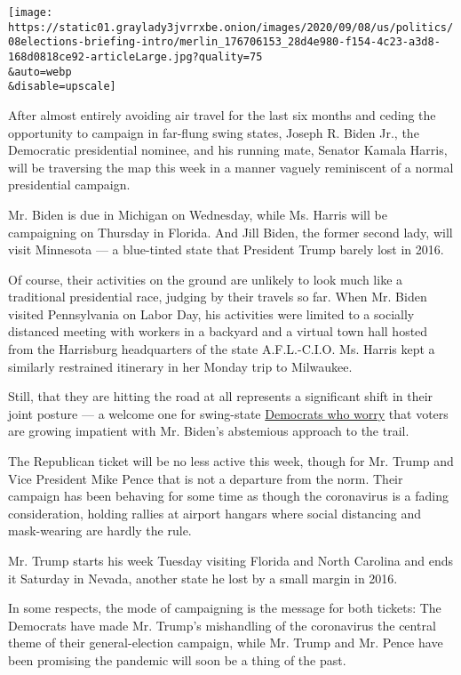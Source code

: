\texttt{[image: https://static01.graylady3jvrrxbe.onion/images/2020/09/08/us/politics/08elections-briefing-intro/merlin\_176706153\_28d4e980-f154-4c23-a3d8-168d0818ce92-articleLarge.jpg?quality=75\\\&auto=webp\\\&disable=upscale]}

After almost entirely avoiding air travel for the last six months and
ceding the opportunity to campaign in far-flung swing states, Joseph R.
Biden Jr., the Democratic presidential nominee, and his running mate,
Senator Kamala Harris, will be traversing the map this week in a manner
vaguely reminiscent of a normal presidential campaign.

Mr. Biden is due in Michigan on Wednesday, while Ms. Harris will be
campaigning on Thursday in Florida. And Jill Biden, the former second
lady, will visit Minnesota --- a blue-tinted state that President Trump
barely lost in 2016.

Of course, their activities on the ground are unlikely to look much like
a traditional presidential race, judging by their travels so far. When
Mr. Biden visited Pennsylvania on Labor Day, his activities were limited
to a socially distanced meeting with workers in a backyard and a virtual
town hall hosted from the Harrisburg headquarters of the state
A.F.L.-C.I.O. Ms. Harris kept a similarly restrained itinerary in her
Monday trip to Milwaukee.

Still, that they are hitting the road at all represents a significant
shift in their joint posture --- a welcome one for swing-state
\href{https://www.nytimes3xbfgragh.onion/live/2020/09/07/us/trump-vs-biden/in-the-final-stretch-biden-is-defending-his-lead-against-a-gop-onslaught}{Democrats
who worry} that voters are growing impatient with Mr. Biden's abstemious
approach to the trail.

The Republican ticket will be no less active this week, though for Mr.
Trump and Vice President Mike Pence that is not a departure from the
norm. Their campaign has been behaving for some time as though the
coronavirus is a fading consideration, holding rallies at airport
hangars where social distancing and mask-wearing are hardly the rule.

Mr. Trump starts his week Tuesday visiting Florida and North Carolina
and ends it Saturday in Nevada, another state he lost by a small margin
in 2016.

In some respects, the mode of campaigning is the message for both
tickets: The Democrats have made Mr. Trump's mishandling of the
coronavirus the central theme of their general-election campaign, while
Mr. Trump and Mr. Pence have been promising the pandemic will soon be a
thing of the past.

